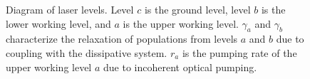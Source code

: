 \begin{figure}
\centering



\caption{Diagram of laser levels. Level $c$ is the ground level, level $b$ is the lower working level, and $a$ is the upper working level. $\gamma_a$ and $\gamma_b$ characterize the relaxation of populations from levels $a$ and $b$ due to coupling with the dissipative system. $r_a$ is the pumping rate of the upper working level $a$ due to incoherent optical pumping.}
\label{figPart2Laser2_1}
\end{figure}